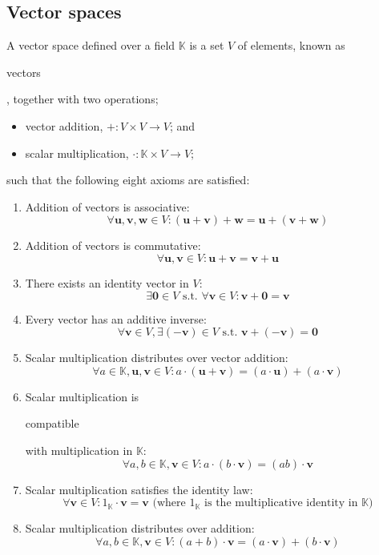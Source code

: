 \documentclass{article}
\newenvironment{itemized}{ 
\begin{itemize}
\setlength{\itemsep}{0pt}
\setlength{\parskip}{0pt}
\setlength{\parsep}{0pt}     
}{\end{itemize}}
\newenvironment{enumerated}{ 
\begin{enumerate}
\setlength{\itemsep}{0pt}
\setlength{\parskip}{0pt}
\setlength{\parsep}{0pt}     
}{\end{enumerate}}
\renewcommand{\vec}[1]{\mathbf{#1}}
\begin{document}
\subsection*{Vector spaces}
A vector space defined over a field $\mathbb{K}$ is a set $V$ of elements, known as \begin{em}vectors\end{em}, together with two operations; 
\begin{itemized}
  \item vector addition, $+ : V \times V \rightarrow V$; and 
  \item scalar multiplication, $\cdot : \mathbb{K} \times V \rightarrow V;$
\end{itemized}
such that the following eight axioms are satisfied:
\begin{enumerated}
  \item Addition of vectors is associative:
  $$ \forall \vec{u}, \vec{v}, \vec{w} \in V : (\vec{u} + \vec{v}) + \vec{w} = \vec{u} + (\vec{v} + \vec{w}) $$
  \item Addition of vectors is commutative:
  $$ \forall \vec{u}, \vec{v} \in V : \vec{u} + \vec{v} = \vec{v} + \vec{u} $$
  \item There exists an identity vector in $V$:
  $$ \exists \vec{0} \in V \text{ s.t. } \forall \vec{v} \in V : \vec{v} + \vec{0} = \vec{v} $$
  \item Every vector has an additive inverse:
  $$ \forall \vec{v} \in V, \exists \vec{(-v)} \in V \text{ s.t. } \vec{v} + \vec{(-v)} = \vec{0} $$
  \item Scalar multiplication distributes over vector addition:
  $$ \forall a \in \mathbb{K}, \vec{u}, \vec{v} \in V : a \cdot (\vec{u} + \vec{v}) = (a \cdot \vec{u}) + (a \cdot \vec{v}) $$
  \item Scalar multiplication is \begin{em}compatible\end{em} with multiplication in $\mathbb{K}$:
  $$ \forall a,b \in \mathbb{K}, \vec{v} \in V : a \cdot (b \cdot \vec{v}) = (ab) \cdot \vec{v} $$
  \item Scalar multiplication satisfies the identity law:
  $$ \forall \vec{v} \in V : 1_{\mathbb{K}} \cdot \vec{v} = \vec{v} \text{ (where $1_{\mathbb{K}}$ is the multiplicative identity in $\mathbb{K}$)} $$
  \item Scalar multiplication distributes over addition:
  $$ \forall a, b \in \mathbb{K}, \vec{v} \in V : (a + b) \cdot \vec{v} = (a \cdot \vec{v}) + (b \cdot \vec{v}) $$
\end{enumerated}
\end{document}
